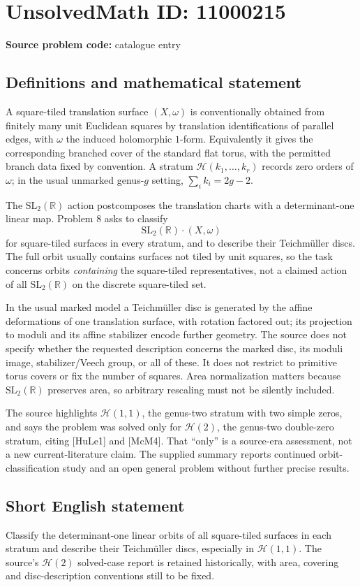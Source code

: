 \documentclass[11pt]{article}
\newcommand{\R}{\mathbb{R}}
\begin{document}
\section*{UnsolvedMath ID: 11000215}
\textbf{Source problem code:} catalogue entry
\subsection{Definitions and mathematical statement}
A square-tiled translation surface \((X,\omega)\) is conventionally obtained from finitely many unit Euclidean squares by translation identifications of parallel edges, with \(\omega\) the induced holomorphic \(1\)-form. Equivalently it gives the corresponding branched cover of the standard flat torus, with the permitted branch data fixed by convention. A stratum \(\mathcal H(k_1,\ldots,k_r)\) records zero orders of \(\omega\); in the usual unmarked genus-\(g\) setting, \(\sum_i k_i=2g-2\).

The \(\mathrm{SL}_2(\R)\) action postcomposes the translation charts with a determinant-one linear map. Problem 8 asks to classify
\[
 \mathrm{SL}_2(\R)\cdot(X,\omega)
\]
for square-tiled surfaces in every stratum, and to describe their Teichmüller discs. The full orbit usually contains surfaces not tiled by unit squares, so the task concerns orbits \emph{containing} the square-tiled representatives, not a claimed action of all \(\mathrm{SL}_2(\R)\) on the discrete square-tiled set.

In the usual marked model a Teichmüller disc is generated by the affine deformations of one translation surface, with rotation factored out; its projection to moduli and its affine stabilizer encode further geometry. The source does not specify whether the requested description concerns the marked disc, its moduli image, stabilizer/Veech group, or all of these. It does not restrict to primitive torus covers or fix the number of squares. Area normalization matters because \(\mathrm{SL}_2(\R)\) preserves area, so arbitrary rescaling must not be silently included.

The source highlights \(\mathcal H(1,1)\), the genus-two stratum with two simple zeros, and says the problem was solved only for \(\mathcal H(2)\), the genus-two double-zero stratum, citing [HuLe1] and [McM4]. That ``only'' is a source-era assessment, not a new current-literature claim. The supplied summary reports continued orbit-classification study and an open general problem without further precise results.
\subsection{Short English statement}
Classify the determinant-one linear orbits of all square-tiled surfaces in each stratum and describe their Teichmüller discs, especially in \(\mathcal H(1,1)\). The source's \(\mathcal H(2)\) solved-case report is retained historically, with area, covering and disc-description conventions still to be fixed.
\end{document}
